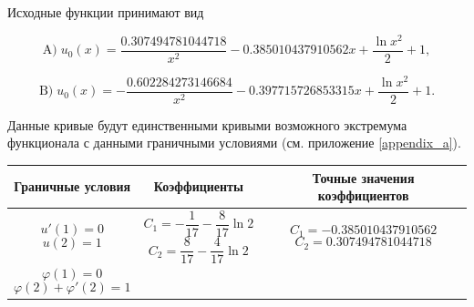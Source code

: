 \documentclass{article}
\begin{document}
\noindent Исходные функции принимают вид

\begin{displaymath}
	\text{A)} \; u_{0}(x) = \frac{0.307494781044718}{x^2} - 0.385010437910562 x + \frac{\ln{x^2}}{2} + 1,
\end{displaymath}

\begin{displaymath}
	\text{B)} \; u_{0}(x) = - \frac{0.602284273146684}{x^2} - 0.397715726853315 x + \frac{\ln{x^2}}{2} + 1.
\end{displaymath}

Данные кривые будут единственными кривыми возможного экстремума функционала с данными граничными условиями (см. приложение \ref{appendix_a}). 

\begin{table}[!h]
	\centering
	\begin{tabular}{|c|c|c|}
		\hline
		Граничные условия &
		Коэффициенты & 
		Точные значения коэффициентов \\
		\hline \hline
	
	\parbox[c]{3cm}{
		\begin{displaymath}
			u'(1) = 0
		\end{displaymath}
		\begin{displaymath}
			u(2) = 1
		\end{displaymath}
	} &
	
	\parbox[c]{3cm}{
		 \begin{displaymath}
			 C_{1} = - \frac{1}{17} - \frac{8}{17} \ln{2}
		 \end{displaymath}
		\begin{displaymath} 	
			 C_{2} = \frac{8}{17} - \frac{4}{17} \ln{2}
		 \end{displaymath}
		 } & 
		 
	\parbox[c]{4.07cm}{
		 \begin{displaymath}
			 C_{1} = -0.385010437910562 
		 \end{displaymath}
		 \begin{displaymath}
			 C_{2} = 0.307494781044718
		 \end{displaymath}
		 }\\	\hline
		
	\parbox[c]{3cm}{
		\begin{displaymath}
			\varphi(1) = 0
		\end{displaymath}
		\begin{displaymath}
			\varphi(2) + \varphi'(2) = 1
		\end{displaymath}
		} &
	

\end{tabular}
\end{table}
\end{document}
